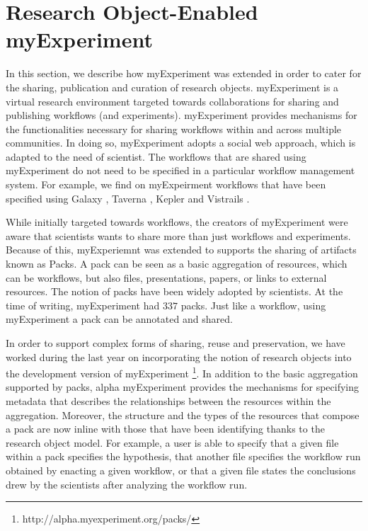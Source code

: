 \section{Research Object-Enabled myExperiment}
\label{sec:myexperiment}


In this section, we describe how myExperiment \cite{} was extended in order to cater for the sharing, publication and curation of research objects. myExperiment is a virtual research environment targeted towards collaborations for sharing and publishing workflows (and experiments). myExperiment provides mechanisms for the functionalities necessary for sharing workflows within and across multiple communities. In doing so, myExperiment adopts a social web approach, which is adapted to the need of scientist. The workflows that are shared using myExperiment do not need to be specified in a particular workflow management system. For example, we find on myExpeirment workflows that have been specified using Galaxy \cite{}, Taverna \cite{}, Kepler \cite{} and Vistrails \cite{}.

While initially targeted towards workflows, the creators of myExperiment were aware that scientists wants to share more than just workflows and experiments. Because of this, myExperiemnt was extended to supports the sharing of artifacts known as Packs. A pack can be seen as a basic aggregation of resources, which can be workflows, but also files, presentations, papers, or links to external resources. 
The notion of packs have been widely adopted by scientists. At the time of writing, myExperiment had $337$ packs. Just like a workflow, using myExperiment a pack can be annotated and shared. 
 
In order to support complex forms of sharing, reuse and preservation, we have worked during the last year on incorporating the notion of research objects into the development version of myExperiment \footnote{http://alpha.myexperiment.org/packs/}. In addition to the basic aggregation supported by packs, alpha myExperiment provides the mechanisms for specifying metadata that describes the relationships between the resources within the aggregation. Moreover, the structure and the types of the resources that compose a pack are now inline with those that have been identifying thanks to the research object model. For example, a user is able to specify that a given file within a pack specifies the hypothesis, that another file specifies the workflow run obtained by enacting a given workflow, or that a given file states the conclusions drew by the scientists after analyzing the workflow run.

